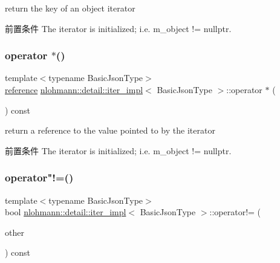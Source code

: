 return the key of an object iterator 

\begin{DoxyPrecond}{前置条件}
The iterator is initialized; i.\+e. {\ttfamily m\+\_\+object != nullptr}. 
\end{DoxyPrecond}
\mbox{\label{classnlohmann_1_1detail_1_1iter__impl_ad6f85e5945429bbdb5a6bef8d3e99d5b}} 
\subsubsection{\texorpdfstring{operator $\ast$()}{operator *()}}
{\footnotesize\ttfamily template$<$typename Basic\+Json\+Type$>$ \\
\mbox{\hyperlink{classnlohmann_1_1detail_1_1iter__impl_a5be8001be099c6b82310f4d387b953ce}{reference}} \mbox{\hyperlink{classnlohmann_1_1detail_1_1iter__impl}{nlohmann\+::detail\+::iter\+\_\+impl}}$<$ Basic\+Json\+Type $>$\+::operator $\ast$ (\begin{DoxyParamCaption}{ }\end{DoxyParamCaption}) const\hspace{0.3cm}{\ttfamily [inline]}}



return a reference to the value pointed to by the iterator 

\begin{DoxyPrecond}{前置条件}
The iterator is initialized; i.\+e. {\ttfamily m\+\_\+object != nullptr}. 
\end{DoxyPrecond}
\mbox{\label{classnlohmann_1_1detail_1_1iter__impl_aeab0e2b5da70b3bdebecd5b1a6ee66a6}} 
\subsubsection{\texorpdfstring{operator"!=()}{operator!=()}}
{\footnotesize\ttfamily template$<$typename Basic\+Json\+Type$>$ \\
bool \mbox{\hyperlink{classnlohmann_1_1detail_1_1iter__impl}{nlohmann\+::detail\+::iter\+\_\+impl}}$<$ Basic\+Json\+Type $>$\+::operator!= (\begin{DoxyParamCaption}\item[{const \mbox{\hyperlink{classnlohmann_1_1detail_1_1iter__impl}{iter\+\_\+impl}}$<$ Basic\+Json\+Type $>$ \&}]{other }\end{DoxyParamCaption}) const\hspace{0.3cm}{\ttfamily [inline]}}



